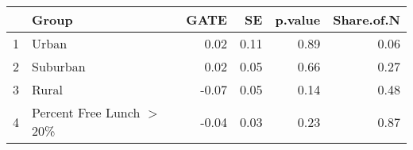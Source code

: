 \begin{tabular}{rlrrrr}
  \hline
 & Group & GATE & SE & p.value & Share.of.N \\ 
  \hline
1 & Urban & 0.02 & 0.11 & 0.89 & 0.06 \\ 
  2 & Suburban & 0.02 & 0.05 & 0.66 & 0.27 \\ 
  3 & Rural & -0.07 & 0.05 & 0.14 & 0.48 \\ 
  4 & Percent Free Lunch $>$ 20\% & -0.04 & 0.03 & 0.23 & 0.87 \\ 
   \hline
\end{tabular}
